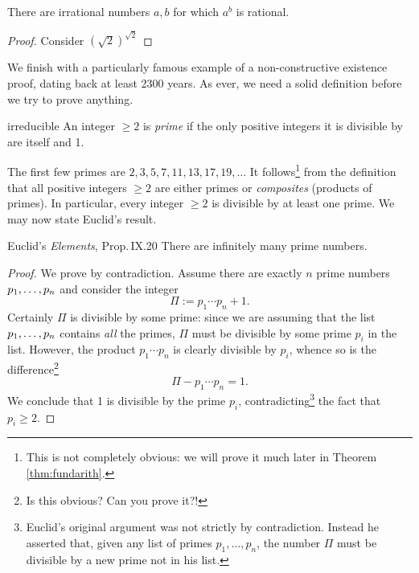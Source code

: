 \begin{thm}{}{}
	There are irrational numbers $a,b$ for which $a^b$ is rational.
\end{thm}

\begin{proof}
	Consider $(\sqrt 2)^{\sqrt 2}$
\end{proof}

We finish with a particularly famous example of a non-constructive existence proof, dating back at least 2300 years. As ever, we need a solid definition before we try to prove anything.

\begin{defn}{}{irreducible}
An integer $\ge 2$ is \emph{prime} if the only positive integers it is divisible by are itself and 1.
\end{defn}

 The first few primes are $2,3,5,7,11,13,17,19,\ldots$ It follows\footnote{This is not completely obvious: we will prove it much later in Theorem \ref{thm:fundarith}.} from the definition that all positive integers $\ge 2$ are either primes or \emph{composites} (products of primes). In particular, every integer $\ge 2$ is divisible by at least one prime. We may now state Euclid's result.

\begin{thm}{Euclid's \emph{Elements}, Prop.\,IX.20}{}
	There are infinitely many prime numbers.
\end{thm}

\begin{proof}
We prove by contradiction. Assume there are exactly $n$ prime numbers ${p}_1,\ldots,{p}_{n}$ and consider the integer
\[\Pi:=p_1\cdots p_n+1.\]
Certainly $\Pi$ is divisible by some prime: since we are assuming that the list ${p}_1,\ldots,{p}_{n}$ contains \emph{all} the primes, $\Pi$ must be divisible by some prime $p_i$ in the list. However, the product $p_1\cdots p_n$ is clearly divisible by $p_i$, whence so is the difference\footnote{Is this obvious? Can you prove it?!}
\[\Pi-p_1\cdots p_n=1.\]
We conclude that 1 is divisible by the prime $p_i$, contradicting\footnote{Euclid's original argument was not strictly by contradiction. Instead he asserted that, given any list of primes $p_1,\ldots,p_n$, the number $\Pi$ must be divisible by a new prime not in his list.} the fact that $p_i\ge 2$.
\end{proof}


